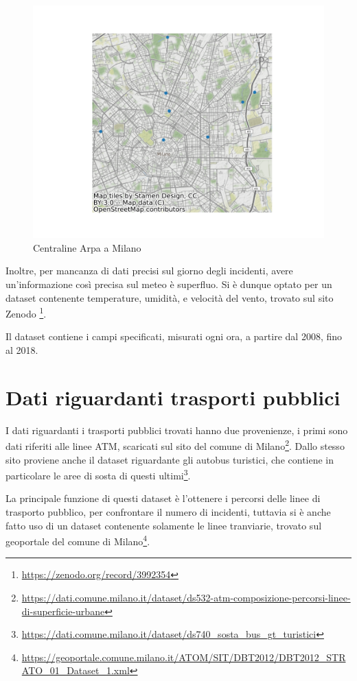\documentclass[a4paper]{report}
\begin{document}
\begin{figure}
    \includegraphics[width=\linewidth]{../src/meteo/centraline_arpa.png}
    \caption{Centraline Arpa a Milano}
    \label{fig:centraline-arpa}
\end{figure}


Inoltre, per mancanza di dati precisi sul giorno degli incidenti, avere un'informazione così 
precisa sul meteo è superfluo.
Si è dunque optato per un dataset contenente temperature, umidità, e velocità del vento, 
trovato sul sito Zenodo
\footnote{\url{https://zenodo.org/record/3992354}}.

Il dataset contiene i campi specificati, misurati ogni ora, a partire dal 2008, fino al 2018.

\section{Dati riguardanti trasporti pubblici}
I dati riguardanti i trasporti pubblici trovati hanno due provenienze, i primi sono 
dati riferiti alle linee ATM, scaricati sul sito del comune di 
Milano\footnote{\url{https://dati.comune.milano.it/dataset/ds532-atm-composizione-percorsi-linee-di-superficie-urbane}}.
Dallo stesso sito proviene anche il dataset riguardante gli autobus turistici, che 
contiene in particolare le aree di sosta di questi 
ultimi\footnote{\url{https://dati.comune.milano.it/dataset/ds740_sosta_bus_gt_turistici}}.

La principale funzione di questi dataset è l'ottenere i percorsi delle linee di trasporto pubblico, 
per confrontare il numero di incidenti, tuttavia si è anche fatto uso di un dataset contenente 
solamente le linee tranviarie, trovato sul geoportale del comune di 
Milano\footnote{\url{https://geoportale.comune.milano.it/ATOM/SIT/DBT2012/DBT2012_STRATO_01_Dataset_1.xml}}.
\end{document}
